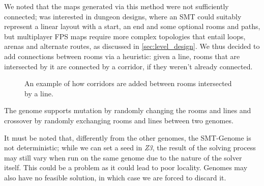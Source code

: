 \documentclass{Configuration_Files/PoliMi3i_thesis}
\begin{document}
We noted that the maps generated via this method were not sufficiently connected; \citeauthor{whitehead_spatial_2020} was interested in dungeon designs, where an SMT could suitably represent a linear layout with a start, an end and some optional rooms and paths, but multiplayer FPS maps require more complex topologies that entail loops, arenas and alternate routes, as discussed in \ref{sec:level_design}. We thus decided to add connections between rooms via a heuristic: given a line, rooms that are intersected by it are connected by a corridor, if they weren't already connected.

\begin{figure}[hbt!]
    \centering
    \qquad
    \caption[SMT-Genome lines]{An example of how corridors are added between rooms intersected by a line.}
    \label{fig:smt_genome}
\end{figure}

The genome supports mutation by randomly changing the rooms and lines and crossover by randomly exchanging rooms and lines between two genomes.

It must be noted that, differently from the other genomes, the SMT-Genome is not deterministic; while we can set a seed in \textit{Z3}, the result of the solving process may still vary when run on the same genome due to the nature of the solver itself. This could be a problem as it could lead to poor locality. Genomes may also have no feasible solution, in which case we are forced to discard it.
\end{document}

